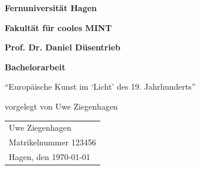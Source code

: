 \begin{titlepage}

{\Huge \textbf{Fernuniversität Hagen}}

{\Large\bfseries Fakultät für cooles MINT}

{\large\bfseries Prof. Dr. Daniel Düsentrieb}

\vspace*{4cm}

\begin{center}\bfseries\Large
Bachelorarbeit

\enquote{Europäische Kunst im \enquote{Licht} des 19. Jahrhunderts}

vorgelegt von Uwe Ziegenhagen
\end{center}

\vfill
\begin{tabular}{l}
Uwe Ziegenhagen \\ 
Matrikelnummer 123456 \\
Hagen, den \today \\
\end{tabular}


\end{titlepage}